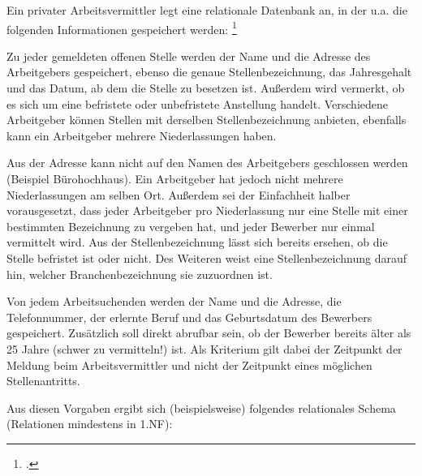 \documentclass{bschlangaul-aufgabe}
\begin{document}

\let\fa=\bFunktionaleAbhaengigkeit
\let\m=\bAttributMenge
\let\r=\bRelationMenge

Ein privater Arbeitsvermittler legt eine relationale Datenbank an, in
der u.a. die folgenden Informationen gespeichert werden:
\footcite[Aufgabe 6]{db:ab:7}

Zu jeder gemeldeten offenen Stelle werden der Name und die Adresse des
Arbeitgebers gespeichert, ebenso die genaue Stellenbezeichnung, das
Jahresgehalt und das Datum, ab dem die Stelle zu besetzen ist. Außerdem
wird vermerkt, ob es sich um eine befristete oder unbefristete
Anstellung handelt. Verschiedene Arbeitgeber können Stellen mit
derselben Stellenbezeichnung anbieten, ebenfalls kann ein Arbeitgeber
mehrere Niederlassungen haben.

Aus der Adresse kann nicht auf den Namen des Arbeitgebers geschlossen
werden (Beispiel Bürohochhaus). Ein Arbeitgeber hat jedoch nicht mehrere
Niederlassungen am selben Ort. Außerdem sei der Einfachheit halber
vorausgesetzt, dass jeder Arbeitgeber pro Niederlassung nur eine Stelle
mit einer bestimmten Bezeichnung zu vergeben hat, und jeder Bewerber nur
einmal vermittelt wird. Aus der Stellenbezeichnung lässt sich bereits
ersehen, ob die Stelle befristet ist oder nicht. Des Weiteren weist eine
Stellenbezeichnung darauf hin, welcher Branchenbezeichnung sie
zuzuordnen ist.

Von jedem Arbeitsuchenden werden der Name und die Adresse, die
Telefonnummer, der erlernte Beruf und das Geburtsdatum des Bewerbers
gespeichert. Zusätzlich soll direkt abrufbar sein, ob der Bewerber
bereits älter als 25 Jahre (schwer zu vermitteln!) ist. Als Kriterium
gilt dabei der Zeitpunkt der Meldung beim Arbeitsvermittler und nicht
der Zeitpunkt eines möglichen Stellenantritts.

Aus diesen Vorgaben ergibt sich (beispielsweise) folgendes relationales
Schema (Relationen mindestens in 1.NF):
\end{document}

